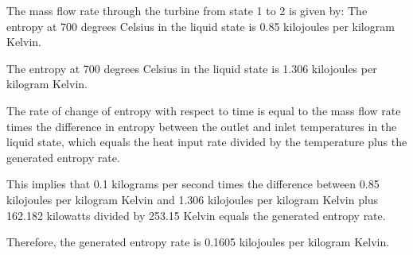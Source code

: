 The mass flow rate through the turbine from state 1 to 2 is given by:
The entropy at 700 degrees Celsius in the liquid state is 0.85 kilojoules per kilogram Kelvin.

The entropy at 700 degrees Celsius in the liquid state is 1.306 kilojoules per kilogram Kelvin.

The rate of change of entropy with respect to time is equal to the mass flow rate times the difference in entropy between the outlet and inlet temperatures in the liquid state, which equals the heat input rate divided by the temperature plus the generated entropy rate.

This implies that 0.1 kilograms per second times the difference between 0.85 kilojoules per kilogram Kelvin and 1.306 kilojoules per kilogram Kelvin plus 162.182 kilowatts divided by 253.15 Kelvin equals the generated entropy rate.

Therefore, the generated entropy rate is 0.1605 kilojoules per kilogram Kelvin.